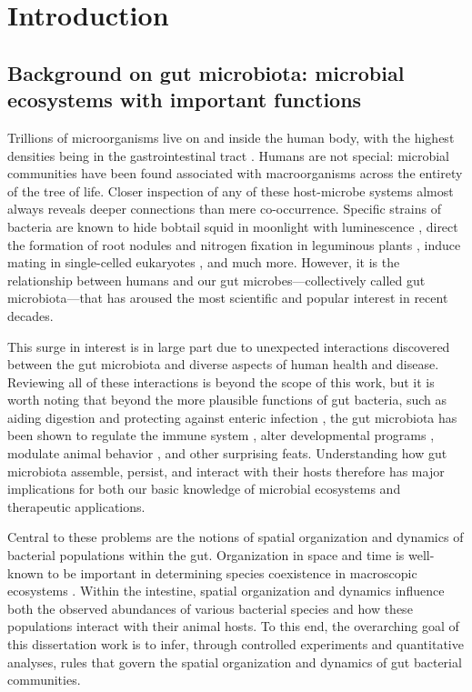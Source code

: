\chapter{Introduction}

\section{Background on gut microbiota: microbial ecosystems with important functions}

Trillions of microorganisms live on and inside the human body, with the highest densities being in the gastrointestinal tract \cite{the_human_microbiome_project_consortium_framework_2012}. Humans are not special: microbial communities have been found associated with macroorganisms across the entirety of the tree of life. Closer inspection of any of these host-microbe systems almost always reveals deeper connections than mere co-occurrence. Specific strains of bacteria are known to hide bobtail squid in moonlight with luminescence \cite{brennan_model_2014}, direct the formation of root nodules and nitrogen fixation in leguminous plants \cite{Teulet21758}, induce mating in single-celled eukaryotes \cite{woznica2017mating}, and much more. However, it is the relationship between humans and our gut microbes---collectively called gut microbiota---that has aroused the most scientific and popular interest in recent decades. 

This surge in interest is in large part due to unexpected interactions discovered between the gut microbiota and diverse aspects of human health and disease. Reviewing all of these interactions is beyond the scope of this work, but it is worth noting that beyond the more plausible functions of gut bacteria, such as aiding digestion \cite{Cox2014} and protecting against enteric infection \cite{McKenney2015}, the gut microbiota has been shown to regulate the immune system \cite{belkaid2014role}, alter developmental programs \cite{Troll2018}, modulate animal behavior \cite{sharon2019human}, and other surprising feats. Understanding how gut microbiota assemble, persist, and interact with their hosts therefore has major implications for both our basic knowledge of microbial ecosystems and therapeutic applications. 

Central to these problems are the notions of spatial organization and dynamics of bacterial populations within the gut. Organization in space and time is well-known to be important in determining species coexistence in macroscopic ecosystems \cite{tilman2018spatial, adlerGrass_2006}. Within the intestine, spatial organization and dynamics influence both the observed abundances of various bacterial species and how these populations interact with their animal hosts. To this end, the overarching goal of this dissertation work is to infer, through controlled experiments and quantitative analyses, rules that govern the spatial organization and dynamics of gut bacterial communities.

